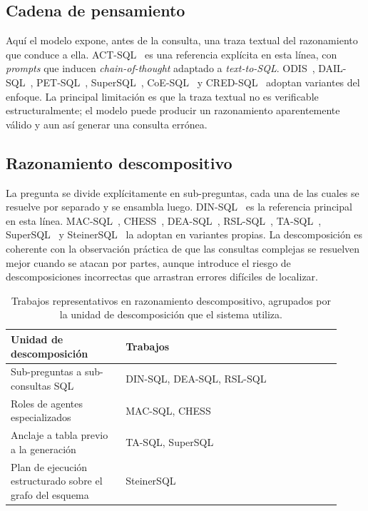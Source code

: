 \subsection{Cadena de pensamiento}
\label{subsec:sota-d5-cot}

Aquí el modelo expone, antes de la consulta, una traza textual del
razonamiento que conduce a ella. ACT-SQL~\cite{ACT-SQL2023} es una
referencia explícita en esta línea, con \emph{prompts} que inducen
\emph{chain-of-thought} adaptado a \emph{text-to-SQL}.
ODIS~\cite{ODIS2023}, DAIL-SQL~\cite{DAIL-SQL2023},
PET-SQL~\cite{PET-SQL2024}, SuperSQL~\cite{SuperSQL2024},
CoE-SQL~\cite{CoE-SQL2024} y CRED-SQL~\cite{CRED-SQL2025} adoptan
variantes del enfoque. La principal limitación es que la traza textual
no es verificable estructuralmente; el modelo puede producir un
razonamiento aparentemente válido y aun así generar una consulta
errónea.

\subsection{Razonamiento descompositivo}
\label{subsec:sota-d5-descompositivo}

La pregunta se divide explícitamente en sub-preguntas, cada una de las
cuales se resuelve por separado y se ensambla luego.
DIN-SQL~\cite{DIN-SQL2023} es la referencia principal en esta línea.
MAC-SQL~\cite{MAC-SQL2023}, CHESS~\cite{CHESS2024},
DEA-SQL~\cite{DEA-SQL2024}, RSL-SQL~\cite{RSL-SQL2024},
TA-SQL~\cite{TA-SQL2024}, SuperSQL~\cite{SuperSQL2024} y
SteinerSQL~\cite{SteinerSQL2025} la adoptan en variantes propias. La
descomposición es coherente con la observación práctica de que las
consultas complejas se resuelven mejor cuando se atacan por partes,
aunque introduce el riesgo de descomposiciones incorrectas que
arrastran errores difíciles de localizar.

\begin{table}[!htbp]
\centering
\footnotesize
\caption{Trabajos representativos en razonamiento descompositivo, agrupados por la unidad de descomposición que el sistema utiliza.}
\label{tab:sota-d5-descompositivo}
\begin{tabular}{@{}p{0.32\linewidth}p{0.60\linewidth}@{}}
\toprule
\textbf{Unidad de descomposición} & \textbf{Trabajos} \\
\midrule
Sub-preguntas a sub-consultas SQL & DIN-SQL, DEA-SQL, RSL-SQL \\
Roles de agentes especializados & MAC-SQL, CHESS \\
Anclaje a tabla previo a la generación & TA-SQL, SuperSQL \\
Plan de ejecución estructurado sobre el grafo del esquema & SteinerSQL \\
\bottomrule
\end{tabular}
\end{table}

